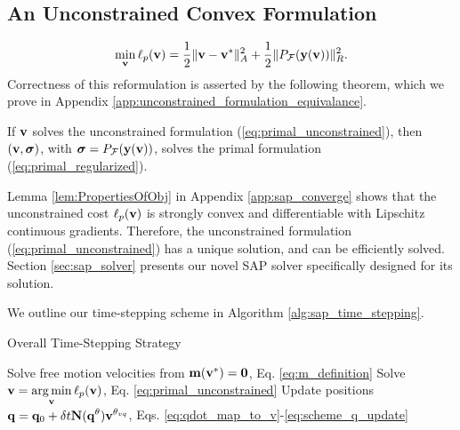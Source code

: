 

\subsection{An Unconstrained Convex Formulation}
\label{sec:unconstrained_convex_formulation}

\begin{eqnarray}
	\min_{\mf{v}} \ell_p(\mf{v}) = \frac{1}{2}\Vert\mf{v}-\mf{v}^*\Vert_{A}^2 +
	\frac{1}{2}\Vert P_\mathcal{F}(\mf{y}(\mf{v}))\Vert_R^2.
	\label{eq:primal_unconstrained}
\end{eqnarray}
Correctness of this reformulation is asserted by the following theorem, which we
prove in Appendix \ref{app:unconstrained_formulation_equivalance}.
\begin{theorem}
  If  ${\mathbf{v}}$ solves the unconstrained formulation
    (\ref{eq:primal_unconstrained}), then $({\mathbf{v}}, {\bm\sigma})$, with ${\bm\sigma}
    =P_\mathcal{F}({\mathbf{y}}({\mathbf{v}}))$, solves the primal formulation
    (\ref{eq:primal_regularized}).
    \label{th:unconstrained_formulation_equivalance}
\end{theorem}
Lemma \ref{lem:PropertiesOfObj} in Appendix \ref{app:sap_converge} shows that
the unconstrained cost $\ell_p({\mathbf{v}})$ is strongly convex and differentiable
with Lipschitz continuous gradients. Therefore, the unconstrained formulation
(\ref{eq:primal_unconstrained}) has a unique solution, and can be efficiently
solved.  
Section \ref{sec:sap_solver} presents our novel SAP solver specifically designed
for its solution.

We outline our time-stepping scheme in Algorithm \ref{alg:sap_time_stepping}.
\begin{algorithm}
	\caption{Overall Time-Stepping Strategy}
	  \label{alg:sap_time_stepping}
	  \begin{algorithmic}[1]
		  \State Solve free motion velocities from
		  ${\mathbf{m}}({\mathbf{v}}^*)={\mathbf{0}}$, Eq. \eqref{eq:m_definition}
		  \State Solve $\displaystyle {\mathbf{v}} = \operatorname*{arg\,min}_{{\mathbf{v}}} \ell_p({\mathbf{v}})$, Eq. \eqref{eq:primal_unconstrained}
		  \State Update positions $\displaystyle {\mathbf{q}} = {\mathbf{q}}_0 + \delta
		  t{\mathbf{N}}({\mathbf{q}}^{\theta}){\mathbf{v}}^{\theta_{vq}}$, Eqs. \eqref{eq:qdot_map_to_v}-\eqref{eq:scheme_q_update}
	  \end{algorithmic}
\end{algorithm}

